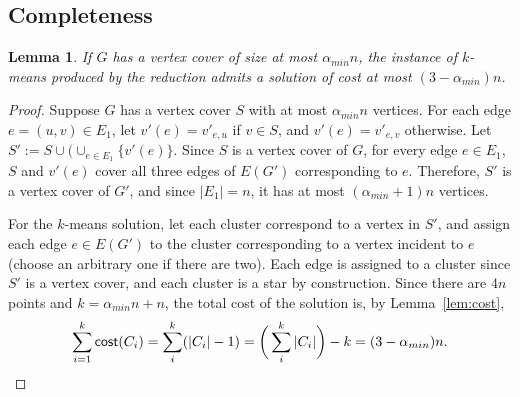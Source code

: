 \documentclass{scrartcl}
\newtheorem{lemma}[theorem]{Lemma}
\newcommand{\cost}{\mathsf{cost}}
\begin{document}
\subsection{Completeness} \begin{lemma}
If $G$ has a vertex cover of size at most $\alpha_{min} n$, the instance of $k$-means produced by the reduction admits a solution of cost at most $(3 - \alpha_{min})n$.
\end{lemma}
\begin{proof}
Suppose $G$ has a vertex cover $S$ with at most $\alpha_{min} n$ vertices.
For each edge $e = (u, v) \in E_1$, let $v'(e) = v'_{e, u}$ if $v \in S$, and $v'(e) = v'_{e, v}$ otherwise. 
Let $S' := S \cup (\cup_{e \in E_1} \{ v'(e) \}$. Since $S$ is a vertex cover of $G$, for every edge $e \in E_1$, $S$ and $v'(e)$ cover all three edges of $E(G')$ corresponding to $e$. 
Therefore, $S'$ is a vertex cover of $G'$, and since $|E_1|=n$, it has at most $(\alpha_{min} + 1)n$ vertices. 

For the $k$-means solution, let each cluster correspond to a vertex in $S'$, and assign each edge $e \in E(G')$ to the cluster corresponding to a vertex incident to $e$ (choose an arbitrary one if there are two). 
Each edge is assigned to a cluster since $S'$ is a vertex cover, and each cluster is a star by construction.
Since there are $4n$ points and $k=\alpha_{min}n +n$, the total cost of the solution is, by Lemma~\ref{lem:cost},
\[
\sum_{i=1}^k \cost(C_i) = \sum_i^k (|C_i| - 1) = \bigg(\sum_i^k |C_i| \bigg) - k = (3 - \alpha_{min})n.\qedhere
\vspace*{-\baselineskip}
\]
\end{proof}
\end{document}
